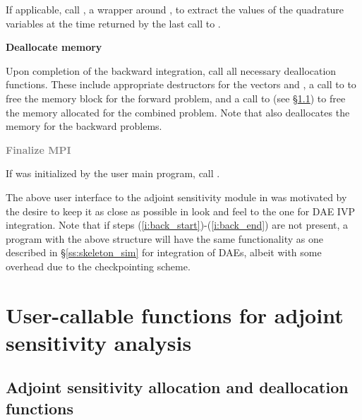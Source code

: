 \begin{Steps}
  If applicable, call , a wrapper around ,
  to extract the values of the quadrature variables at the time returned
  by the last call to .

\item
  {\bf Deallocate memory}

  Upon completion of the backward integration, call all necessary deallocation
  functions. These include appropriate destructors for the vectors 
   and , a call to  to free the {\idas} memory block 
  for the forward problem, and a call to  (see \S\ref{sss:idaadjinit}) to free 
  the memory allocated for the combined problem. 
  Note that  also deallocates the {\idas} memory for the backward problems.

\item
  \textcolor{gray}{\bf Finalize MPI}

  {\p} If {\mpi} was initialized by the user main program, call .

\end{Steps}

The above user interface to the adjoint sensitivity module in {\idas} was motivated by
the desire to keep it as close as possible in look and feel to the one for DAE IVP 
integration. Note that if steps (\ref{i:back_start})-(\ref{i:back_end}) are not present, 
a program with the above structure will have the same functionality as one described in
\S\ref{ss:skeleton_sim} for integration of DAEs, albeit with some overhead due to 
the checkpointing scheme.

\section{User-callable functions for adjoint sensitivity analysis}

\subsection{Adjoint sensitivity allocation and deallocation functions}
\label{sss:idaadjinit}


